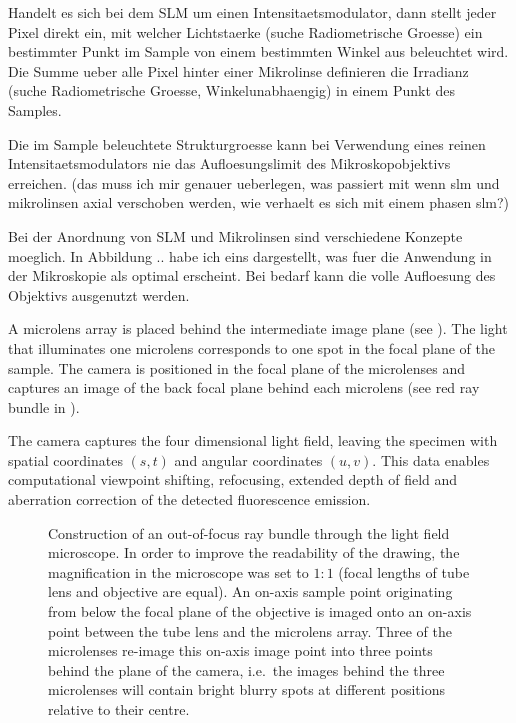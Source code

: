 Handelt es sich bei dem SLM um einen Intensitaetsmodulator, dann
stellt jeder Pixel direkt ein, mit welcher Lichtstaerke (suche
Radiometrische Groesse) ein bestimmter Punkt im Sample von einem
bestimmten Winkel aus beleuchtet wird.  Die Summe ueber alle Pixel
hinter einer Mikrolinse definieren die Irradianz (suche Radiometrische
Groesse, Winkelunabhaengig) in einem Punkt des Samples.

Die im Sample beleuchtete Strukturgroesse kann bei Verwendung eines
reinen Intensitaetsmodulators nie das Aufloesungslimit des
Mikroskopobjektivs erreichen. (das muss ich mir genauer ueberlegen,
was passiert mit wenn slm und mikrolinsen axial verschoben werden, wie
verhaelt es sich mit einem phasen slm?)

Bei der Anordnung von SLM und Mikrolinsen sind verschiedene Konzepte
moeglich. In Abbildung .. habe ich eins dargestellt, was fuer die
Anwendung in der Mikroskopie als optimal erscheint. Bei bedarf kann
die volle Aufloesung des Objektivs ausgenutzt werden.

A microlens array is placed behind the intermediate image plane (see
). The light that illuminates one
microlens corresponds to one spot in the focal plane of the
sample. The camera is positioned in the focal plane of the microlenses
and captures an image of the back focal plane behind each microlens
(see red ray bundle in ).

The camera captures the four dimensional light field, leaving the
specimen with spatial coordinates $(s,t)$ and angular coordinates
$(u,v)$. This data enables computational viewpoint shifting,
refocusing, extended depth of field and aberration correction of the
detected fluorescence emission.

\begin{figure}[htbp]
  \centering
  \caption{Construction of an out-of-focus ray bundle through the
    light field microscope. In order to improve the readability of the
    drawing, the magnification in the microscope was set to $1:1$
    (focal lengths of tube lens and objective are equal). An on-axis
    sample point originating from below the focal plane of the
    objective is imaged onto an on-axis point between the tube lens
    and the microlens array. Three of the microlenses re-image this
    on-axis image point into three points behind the plane of the
    camera, i.e.\ the images behind the three microlenses will contain
    bright blurry spots at different positions relative to their
    centre.}
  \label{fig:microlens-levoy-sketch_2}
\end{figure}

